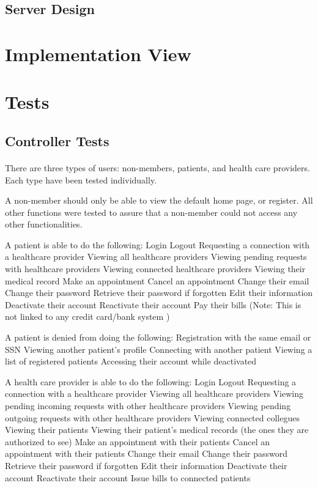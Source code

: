 \documentclass[12pt]{report}
\begin{document}
\subsection{Server Design}

\section{Implementation View}

\section{Tests}

\subsection{Controller Tests}

\paragraph{} 
There are three types of users: non-members, patients, and health care providers. Each type have been tested individually.

A non-member should only be able to view the default home page, or register. All other functions were tested to assure that a non-member could not access any other functionalities. 

A patient is able to do the following:
\bullet Login
\bullet Logout
\bullet Requesting a connection with a healthcare provider
\bullet Viewing all healthcare providers
\bullet Viewing pending requests with healthcare providers
\bullet Viewing connected healthcare providers
\bullet Viewing their medical record
\bullet Make an appointment 
\bullet Cancel an appointment
\bullet Change their email
\bullet Change their password
\bullet Retrieve their password if forgotten
\bullet Edit their information
\bullet Deactivate their account
\bullet Reactivate their account
\bullet Pay their bills (Note: This is not linked to any credit card/bank system ) 

A patient is denied from doing the following:
\bullet Registration with the same email or SSN 
\bullet Viewing another patient's profile
\bullet Connecting with another patient
\bullet Viewing a list of registered patients
\bullet Accessing their account while deactivated

A health care provider is able to do the following:
\bullet Login
\bullet Logout
\bullet Requesting a connection with a healthcare provider
\bullet Viewing all healthcare providers
\bullet Viewing pending incoming requests with other healthcare providers
\bullet Viewing pending outgoing requests with other healthcare providers
\bullet Viewing connected collegues
\bullet Viewing their patients
\bullet Viewing their patient's medical records (the ones they are authorized to see)
\bullet Make an appointment with their patients
\bullet Cancel an appointment with their patients
\bullet Change their email
\bullet Change their password
\bullet Retrieve their password if forgotten
\bullet Edit their information
\bullet Deactivate their account
\bullet Reactivate their account
\bullet Issue bills to connected patients
\end{document}
